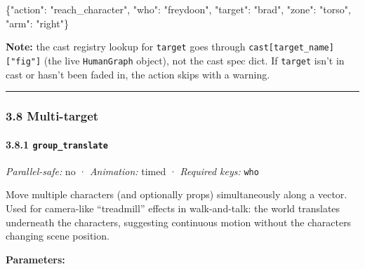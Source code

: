 \documentclass[
  11pt,
]{book}
\newenvironment{Shaded}{}{}
\newcommand{\DataTypeTok}[1]{\textcolor[rgb]{0.56,0.13,0.00}{#1}}
\newcommand{\FunctionTok}[1]{\textcolor[rgb]{0.02,0.16,0.49}{#1}}
\newcommand{\StringTok}[1]{\textcolor[rgb]{0.25,0.44,0.63}{#1}}
\begin{document}
\begin{Shaded}
\begin{Highlighting}[]
\FunctionTok{\{}\DataTypeTok{"action"}\FunctionTok{:} \StringTok{"reach\_character"}\FunctionTok{,} \DataTypeTok{"who"}\FunctionTok{:} \StringTok{"freydoon"}\FunctionTok{,} \DataTypeTok{"target"}\FunctionTok{:} \StringTok{"brad"}\FunctionTok{,}
 \DataTypeTok{"zone"}\FunctionTok{:} \StringTok{"torso"}\FunctionTok{,} \DataTypeTok{"arm"}\FunctionTok{:} \StringTok{"right"}\FunctionTok{\}}
\end{Highlighting}
\end{Shaded}

\textbf{Note:} the cast registry lookup for \texttt{target} goes through
\texttt{cast{[}target\_name{]}{[}"fig"{]}} (the live \texttt{HumanGraph}
object), not the cast spec dict. If \texttt{target} isn't in cast or
hasn't been faded in, the action skips with a warning.

\begin{center}\rule{0.5\linewidth}{0.5pt}\end{center}

\subsubsection{3.8 Multi-target}\label{multi-target}

\paragraph{\texorpdfstring{3.8.1
\texttt{group\_translate}}{3.8.1 group\_translate}}\label{group_translate}

\emph{Parallel-safe:} no · \emph{Animation:} timed · \emph{Required
keys:} \texttt{who}

Move multiple characters (and optionally props) simultaneously along a
vector. Used for camera-like ``treadmill'' effects in walk-and-talk: the
world translates underneath the characters, suggesting continuous motion
without the characters changing scene position.

\textbf{Parameters:}
\end{document}

